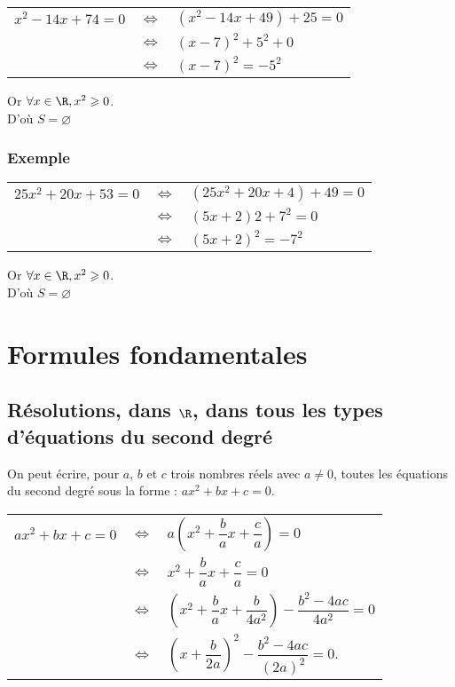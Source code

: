\begin{tabular}{lll}
$x^2 - 14x + 74 = 0$ & $\Longleftrightarrow$ & $\left(x^2 - 14x + 49\right) + 25 = 0$ \\
& $\Longleftrightarrow$ & $\left(x-7\right)^2 + 5^2 + 0$ \\
& $\Longleftrightarrow$ & $\left(x-7\right)^2 = -5^2 $ \\
\end{tabular}

Or $\forall x \in \R, x^2 \geqslant 0$. \\

D'où $S = \varnothing$ \\

\subsubsection{Exemple }

\begin{tabular}{lll}
$25x^2 + 20x + 53 = 0$ & $\Longleftrightarrow$ & $\left(25x^2 + 20x + 4\right) + 49 = 0$ \\
& $\Longleftrightarrow$ &  $\left(5x + 2\right)2 + 7^2 = 0$ \\
& $\Longleftrightarrow$ & $\left(5x + 2\right)^2 = -7^2$ \\
\end{tabular}

Or $\forall x \in \R, x^2 \geqslant 0$. \\

D'où $S = \varnothing$ 

\newpage

\section{Formules fondamentales}

\subsection{Résolutions, dans $\mathbf{\R}$, dans tous les types d'équations du second degré }

On peut écrire, pour $a$, $b$ et $c$ trois nombres réels avec $a \neq 0$, toutes les équations du second degré sous la forme : $ax^2 + bx + c = 0$. \\

\begin{tabular}{lll}
$ax^2 + bx + c = 0$ & $\Longleftrightarrow$ & $a\left(x^2 + \dfrac{b}{a}x + \dfrac{c}{a}\right) = 0$ \\
& $\Longleftrightarrow$ & $x^2 + \dfrac{b}{a}x + \dfrac{c}{a} = 0$ \\
& $\Longleftrightarrow$ & $ \left(x^2 + \dfrac{b}{a} x + \dfrac{b}{4a^2}\right) - \dfrac{b^2 - 4ac}{4a^2} = 0 $ \\
& $\Longleftrightarrow$ & $\left(x + \dfrac{b}{2a} \right)^2 - \dfrac{b^2 - 4ac}{\left(2a\right)^2} = 0$. \\
\end{tabular}

